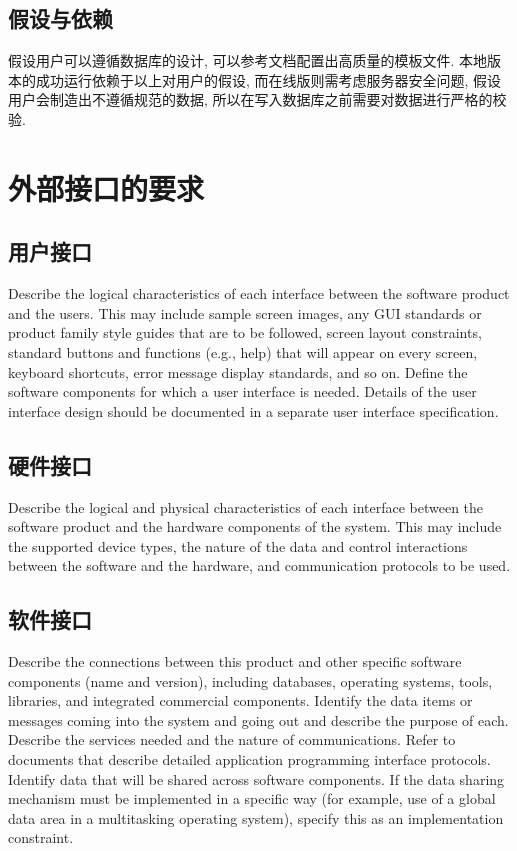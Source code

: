\documentclass{ctexart}
\begin{document}
\subsection{假设与依赖}
假设用户可以遵循数据库的设计, 可以参考文档配置出高质量的模板文件. 本地版本的成功运行依赖于以上对用户的假设, 而在线版则需考虑服务器安全问题, 假设用户会制造出不遵循规范的数据, 所以在写入数据库之前需要对数据进行严格的校验.



\section{外部接口的要求}\label{S:external-interface-requirements}
\subsection{用户接口}
Describe the logical characteristics of each interface between the software 
product and the users. This may include sample screen images, any GUI standards 
or product family style guides that are to be followed, screen layout 
constraints, standard buttons and functions (e.g., help) that will appear on 
every screen, keyboard shortcuts, error message display standards, and so on.  
Define the software components for which a user interface is needed. Details of 
the user interface design should be documented in a separate user interface 
specification.


\subsection{硬件接口}
Describe the logical and physical characteristics of each interface between 
the software product and the hardware components of the system. This may include 
the supported device types, the nature of the data and control interactions 
between the software and the hardware, and communication protocols to be 
used.


\subsection{软件接口}
Describe the connections between this product and other specific software 
components (name and version), including databases, operating systems, tools, 
libraries, and integrated commercial components. Identify the data items or 
messages coming into the system and going out and describe the purpose of each.  
Describe the services needed and the nature of communications. Refer to 
documents that describe detailed application programming interface protocols.  
Identify data that will be shared across software components. If the data 
sharing mechanism must be implemented in a specific way (for example, use of a 
global data area in a multitasking operating system), specify this as an 
implementation constraint.
\end{document}
